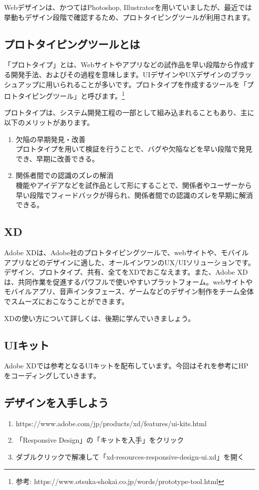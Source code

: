\documentclass[mingoth,11pt,a4j,uplatex,dvipdfmx]{jsarticle}
\begin{document}
Webデザインは、かつてはPhotoshop, Illustratorを用いていましたが、最近では挙動もデザイン段階で確認するため、プロトタイピングツールが利用されます。

\subsection{プロトタイピングツールとは}
「プロトタイプ」とは、Webサイトやアプリなどの試作品を早い段階から作成する開発手法、およびその過程を意味します。UIデザインやUXデザインのブラッシュアップに用いられることが多いです。プロトタイプを作成するツールを「プロトタイピングツール」と呼びます。\footnote{参考: https://www.otsuka-shokai.co.jp/words/prototype-tool.html}

プロトタイプは、システム開発工程の一部として組み込まれることもあり、主に以下のメリットがあります。
\begin{enumerate}
\item 欠陥の早期発見・改善\\
プロトタイプを用いて検証を行うことで、バグや欠陥などを早い段階で発見でき、早期に改善できる。
\item 関係者間での認識のズレの解消\\
機能やアイデアなどを試作品として形にすることで、関係者やユーザーから早い段階でフィードバックが得られ、関係者間での認識のズレを早期に解消できる。
\end{enumerate}

\subsection{XD}
Adobe XDは、Adobe社のプロトタイピングツールで、webサイトや、モバイルアプリなどのデザインに適した、オールインワンのUX/UIソリューションです。デザイン、プロトタイプ、共有、全てをXDでおこなえます。また、Adobe XDは、共同作業を促進するパワフルで使いやすいプラットフォーム。webサイトやモバイルアプリ、音声インタフェース、ゲームなどのデザイン制作をチーム全体でスムーズにおこなうことができます。

XDの使い方について詳しくは、後期に学んでいきましょう。

\subsection{UIキット}
Adobe XDでは参考となるUIキットを配布しています。今回はそれを参考にHPをコーディングしていきます。

\subsection{デザインを入手しよう}
\begin{enumerate}
\item https://www.adobe.com/jp/products/xd/features/ui-kits.html
\item 「Responsive Design」の「キットを入手」をクリック
\item ダブルクリックで解凍して「xd-resources-responsive-design-ui.xd」を開く
\end{enumerate}
\end{document}
